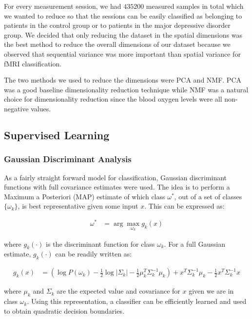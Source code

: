 \documentclass{article}[12pt]
\begin{document}
   For every measurement session, we had $435200$ measured samples in total which we wanted to reduce so that the sessions can be easily classified as belonging to patients in the control group or to patients in the major depressive disorder group. We decided that only reducing the dataset in the spatial dimensions was the best method to reduce the overall dimensions of our dataset because we observed that sequential variance was more important than spatial variance for fMRI classification. 
   
   The two methods we used to reduce the dimensions were PCA and NMF. PCA was a good baseline dimensionality reduction technique while NMF was a natural choice for dimensionality reduction since the blood oxygen levels were all non-negative values. 
   
   \subsection{Supervised Learning}
   \subsubsection{Gaussian Discriminant Analysis}
   As a fairly straight forward model for classification, Gaussian discriminant functions with full covariance estimates were used. The idea is to perform a Maximum a Posteriori (MAP) estimate of which class $\omega^*$, out of a set of classes $\lbrace \omega_k \rbrace$, is best representative given some input $x$. This can be expressed as:
   
   \begin{align*}
   \omega^* &= \arg \max_{\omega_k} g_k(x)
   \end{align*}
   
   where $g_k(\cdot)$ is the discriminant function for class $\omega_k$. For a full Gaussian estimate, $g_k(\cdot)$ can be readily written as:
   
   \begin{align*}
   g_k(x) &= \left( \log P(\omega_k) - \frac{1}{2} \log \left| \Sigma_k \right| - \frac{1}{2} \mu_k^T \Sigma_k^{-1} \mu_k \right) + x^T \Sigma_k^{-1} \mu_k - \frac{1}{2} x^T \Sigma_k^{-1} x 
   \end{align*}
   
   where $\mu_k$ and $\Sigma_k$ are the expected value and covariance for $x$ given we are in class $\omega_k$. Using this representation, a classifier can be efficiently learned and used to obtain quadratic decision boundaries.
   
\end{document}
